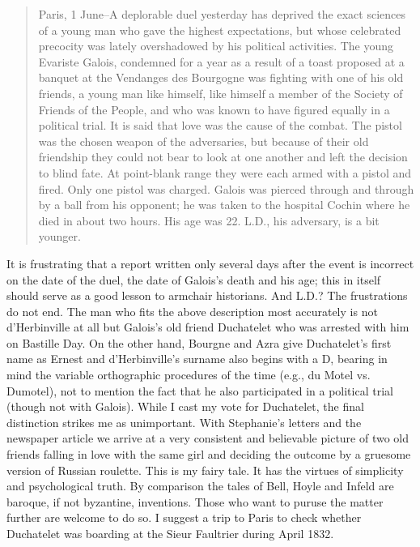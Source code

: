 \documentclass[12pt]{article}
\begin{document}
\begin{quote}
Paris, 1 June--A deplorable duel yesterday has deprived the exact sciences of a young man who gave the highest expectations, but whose celebrated precocity was lately overshadowed by his political activities. The young Evariste Galois, condemned for a year as a result of a toast proposed at a banquet at the Vendanges des Bourgogne was fighting with one of his old friends, a young man like himself, like himself a member of the Society of Friends of the People, and who was known to have figured equally in a political trial. It is said that love was the cause of the combat. The pistol was the chosen weapon of the adversaries, but because of their old friendship they could not bear to look at one another and left the decision to blind fate. At point-blank range they were each armed with a pistol and fired. Only one pistol was charged. Galois was pierced through and through by a ball from his opponent; he was taken to the hospital Cochin where he died in about two hours. His age was 22. L.D., his adversary, is a bit younger.
\end{quote}

It is frustrating that a report written only several days after the event is incorrect on the date of the duel, the date of Galois's death and his age; this in itself should serve as a good lesson to armchair historians. And L.D.? The frustrations do not end. The man who fits the above description most accurately is not d'Herbinville at all but Galois's old friend Duchatelet who was arrested with him on Bastille Day. On the other hand, Bourgne and Azra give Duchatelet's first name as Ernest and d'Herbinville's surname also begins with a D, bearing in mind the variable orthographic procedures of the time (e.g., du Motel vs. Dumotel), not to mention the fact that he also participated in a political trial (though not with Galois). While I cast my vote for Duchatelet, the final distinction strikes me as unimportant. With Stephanie's letters and the newspaper article we arrive at a very consistent and believable picture of two old friends falling in love with the same girl and deciding the outcome by a gruesome version of Russian roulette. This is my fairy tale. It has the virtues of simplicity and psychological truth. By comparison the tales of Bell, Hoyle and Infeld are baroque, if not byzantine, inventions. Those who want to puruse the matter further are welcome to do so. I suggest a trip to Paris to check whether Duchatelet was boarding at the Sieur Faultrier during April 1832.
\end{document}
